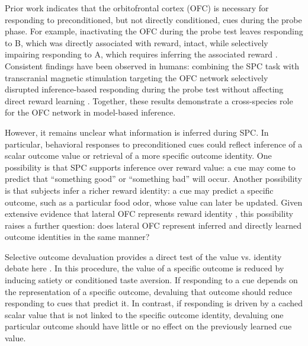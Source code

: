 \documentclass[12pt,letterpaper]{article}
\begin{document}
Prior work indicates that the orbitofrontal cortex (OFC) is necessary for responding to preconditioned, but not directly conditioned, cues during the probe phase. For example, inactivating the OFC during the probe test leaves responding to B, which was directly associated with reward, intact, while selectively impairing responding to A, which requires inferring the associated reward \cite{jones12}. Consistent findings have been observed in humans: combining the SPC task with transcranial magnetic stimulation targeting the OFC network selectively disrupted inference-based responding during the probe test without affecting direct reward learning \cite{wang2020targeted}. Together, these results demonstrate a cross-species role for the OFC network in model-based inference.



However, it remains unclear what information is inferred during SPC. In particular, behavioral responses to preconditioned cues could reflect inference of a scalar outcome value or retrieval of a more specific outcome identity. One possibility is that SPC supports inference over reward value: a cue may come to predict that ``something good'' or ``something bad'' will occur. Another possibility is that subjects infer a richer reward identity: a cue may predict a specific outcome, such as a particular food odor, whose value can later be updated. Given extensive evidence that lateral OFC represents reward identity \cite{howard2015identity,howard2017identity,howard2018identity,howard2021specific,liuyaoatt24,witkowski2026identity}, this possibility raises a further question: does lateral OFC represent inferred and directly learned outcome identities in the same manner?


Selective outcome devaluation provides a direct test of the value vs. identity debate here \cite{HowRey2020,liu2025distinct,hart20}. In this procedure, the value of a specific outcome is reduced by inducing satiety or conditioned taste aversion. If responding to a cue depends on the representation of a specific outcome, devaluing that outcome should reduce responding to cues that predict it. In contrast, if responding is driven by a cached scalar value that is not linked to the specific outcome identity, devaluing one particular outcome should have little or no effect on the previously learned cue value. 
\end{document}
